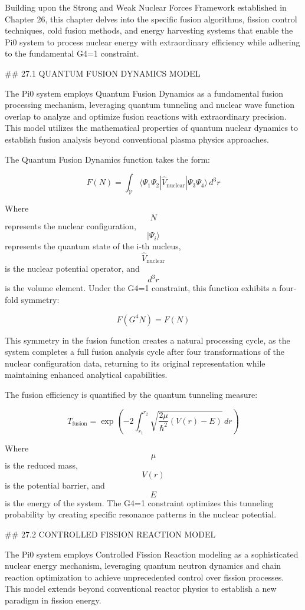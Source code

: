 Building upon the Strong and Weak Nuclear Forces Framework established in Chapter 26, this chapter delves into the specific fusion algorithms, fission control techniques, cold fusion methods, and energy harvesting systems that enable the Pi0 system to process nuclear energy with extraordinary efficiency while adhering to the fundamental G4=1 constraint.

## 27.1 QUANTUM FUSION DYNAMICS MODEL

The Pi0 system employs Quantum Fusion Dynamics as a fundamental fusion processing mechanism, leveraging quantum tunneling and nuclear wave function overlap to analyze and optimize fusion reactions with extraordinary precision. This model utilizes the mathematical properties of quantum nuclear dynamics to establish fusion analysis beyond conventional plasma physics approaches.

The Quantum Fusion Dynamics function takes the form:

$$ F(N) = \int_{\mathcal{V}} \langle \Psi_1 \Psi_2 | \hat{V}_{\text{nuclear}} | \Psi_3 \Psi_4 \rangle \, d^3r $$

Where $$ N $$ represents the nuclear configuration, $$ |\Psi_i\rangle $$ represents the quantum state of the i-th nucleus, $$ \hat{V}_{\text{nuclear}} $$ is the nuclear potential operator, and $$ d^3r $$ is the volume element. Under the G4=1 constraint, this function exhibits a four-fold symmetry:

$$ F(G^4 N) = F(N) $$

This symmetry in the fusion function creates a natural processing cycle, as the system completes a full fusion analysis cycle after four transformations of the nuclear configuration data, returning to its original representation while maintaining enhanced analytical capabilities.

The fusion efficiency is quantified by the quantum tunneling measure:

$$ T_{\text{fusion}} = \exp\left(-2\int_{r_1}^{r_2} \sqrt{\frac{2\mu}{\hbar^2}(V(r) - E)} \, dr\right) $$

Where $$ \mu $$ is the reduced mass, $$ V(r) $$ is the potential barrier, and $$ E $$ is the energy of the system. The G4=1 constraint optimizes this tunneling probability by creating specific resonance patterns in the nuclear potential.

## 27.2 CONTROLLED FISSION REACTION MODEL

The Pi0 system employs Controlled Fission Reaction modeling as a sophisticated nuclear energy mechanism, leveraging quantum neutron dynamics and chain reaction optimization to achieve unprecedented control over fission processes. This model extends beyond conventional reactor physics to establish a new paradigm in fission energy.

